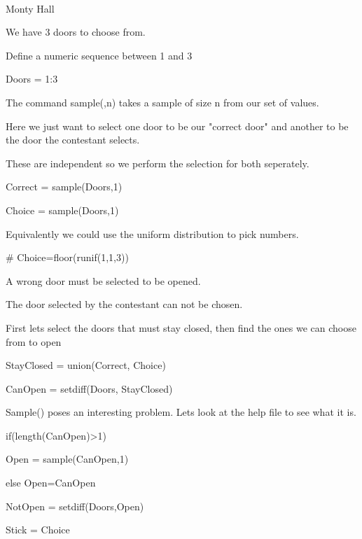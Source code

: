 


Monty Hall

 



We have 3 doors to choose from.


Define a numeric sequence between 1 and 3


Doors = 1:3 


The command sample(,n) takes a sample of size n from our set of values.

Here we just want to select one door to be our "correct door" and another to be the door the contestant selects.


These are independent so we perform the selection for both seperately.








Correct = sample(Doors,1)

Choice = sample(Doors,1)
 


Equivalently we could use the uniform distribution to pick numbers.


# Choice=floor(runif(1,1,3))



A wrong door must be selected to be opened. 


The door selected by the contestant can not be chosen.

First lets select the doors that must stay closed, then find the ones we can choose from to open









StayClosed = union(Correct, Choice)


CanOpen = setdiff(Doors, StayClosed)
 



Sample() poses an interesting problem. Lets look at the help file to see what it is.










if(length(CanOpen)>1)

{

Open = sample(CanOpen,1) 

}else {Open=CanOpen}


NotOpen = setdiff(Doors,Open)


Stick = Choice

